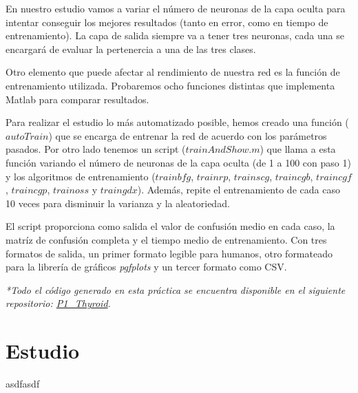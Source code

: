 \documentclass[a4paper,12pt,titlepage]{article}
\begin{document}
En nuestro estudio vamos a variar el número de neuronas de la capa oculta para intentar conseguir los mejores resultados (tanto en error, como en tiempo de entrenamiento). La capa de salida siempre va a tener tres neuronas, cada una se encargará de evaluar la pertenercia a una de las tres clases.

Otro elemento que puede afectar al rendimiento de nuestra red es la función de entrenamiento utilizada. Probaremos ocho funciones distintas que implementa Matlab para comparar resultados.

Para realizar el estudio lo más automatizado posible, hemos creado una función ($autoTrain$) que se encarga de entrenar la red de acuerdo con los parámetros pasados. Por otro lado tenemos un script ($trainAndShow.m$) que llama a esta función variando el número de neuronas de la capa oculta (de 1 a 100 con paso 1) y los algoritmos de entrenamiento ($trainbfg$, $trainrp$, $trainscg$, $traincgb$,  $traincgf$, $traincgp$, $trainoss$ y $traingdx$). Además, repite el entrenamiento de cada caso 10 veces para disminuir la varianza y la aleatoriedad.

El script proporciona como salida el valor de confusión medio en cada caso,  la matríz de confusión completa y el tiempo medio de entrenamiento. Con tres formatos de salida, un primer formato legible para humanos, otro formateado para la librería de gráficos \textit{pgfplots} y un tercer formato como CSV.

\emph{*Todo el código generado en esta práctica se encuentra disponible en el siguiente repositorio: 
\href{https://github.com/davidmigloz/neuronal-networks/tree/master/P1\_Thyroid}{P1\_Thyroid}.}

\section{Estudio}

asdfasdf

\newpage
{}
\end{document}
